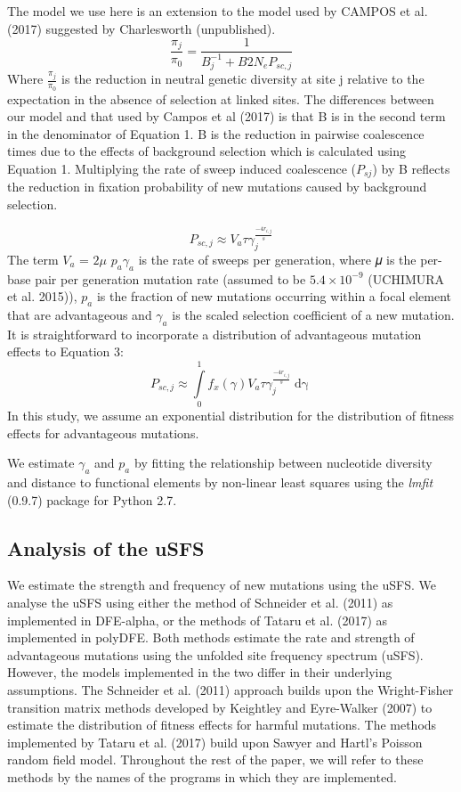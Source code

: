 \documentclass{article}
\begin{document}
The model we use here is an extension to the model used by CAMPOS et al. (2017) suggested by Charlesworth (unpublished). 
\begin{equation}
\frac{\pi_{j}}{\pi_{0}} = \frac{1}{B_{j}^{-1}  + B2N_eP_{sc,j}}
\end{equation}
	Where \(\frac{\pi_{j}}{\pi_{0}}\) is the reduction in neutral genetic diversity at site j relative to the expectation in the absence of selection at linked sites. The differences between our model and that used by Campos et al (2017) is that B is in the second term in the denominator of Equation 1. B is the reduction in pairwise coalescence times due to the effects of background selection which is calculated using Equation 1. Multiplying the rate of sweep induced coalescence ($P_{sj}$) by B reflects the reduction in fixation probability of new mutations caused by background selection. 

\begin{equation}
P_{sc,j} \approx V_a \tau\gamma_j^{\frac{-4r_{i,j}}{s}} 
\end{equation}
The term $V_{a}$ = $2\mu$ $p_{a}\gamma_{a}$ is the rate of sweeps per generation, where 𝜇 is the per-base pair per generation mutation rate (assumed to be $5.4 \times 10^{-9}$ (UCHIMURA et al. 2015)), $p_a$ is the fraction of new mutations occurring within a focal element that are advantageous and $\gamma_a$  is the scaled selection coefficient of a new mutation. It is straightforward to incorporate a distribution of advantageous mutation effects to Equation 3:
		\begin{equation}
P_{sc,j} \approx \int \limits_{0}^{1} f_x(\gamma)   V_a \tau\gamma_j^{\frac{-4r_{i,j}}{s}} \mathop{d\gamma}
\end{equation}	
In this study, we assume an exponential distribution for the distribution of fitness effects for advantageous mutations. 

	We estimate $\gamma_a$ and $p_a$ by fitting the relationship between nucleotide diversity and distance to functional elements by non-linear least squares using the \emph{lmfit} (0.9.7) package for Python 2.7.

	\subsection*{Analysis of the uSFS}

	We estimate the strength and frequency of new mutations using the uSFS. We analyse the uSFS using either the method of Schneider et al. (2011) as implemented in DFE-alpha, or the methods of Tataru et al. (2017) as implemented in polyDFE. Both methods estimate the rate and strength of advantageous mutations using the unfolded site frequency spectrum (uSFS). However, the models implemented in the two differ in their underlying assumptions. The Schneider et al. (2011) approach builds upon the Wright-Fisher transition matrix methods developed by Keightley and Eyre-Walker (2007) to estimate the distribution of fitness effects for harmful mutations. The methods implemented by Tataru et al. (2017) build upon Sawyer and Hartl’s Poisson random field model.
Throughout the rest of the paper, we will refer to these methods by the names of the programs in which they are implemented.
\end{document}
